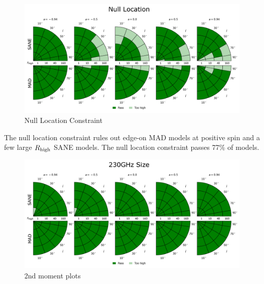 
\begin{figure}
  \centering
  \includegraphics[width=\columnwidth]{./figures/Null_loc_Constraints.png}
  \caption{Null Location Constraint}
  \label{fig:cmp_ozel}
\end{figure}

The null location constraint rules out edge-on MAD models at positive spin and a few large $R_\mathrm{high}$ SANE models.  The null location constraint passes 77\% of models.


\begin{figure}
  \centering
  \includegraphics[width=\columnwidth]{./figures/230GHz_size_Constraints.png}
  \caption{2nd moment plots}
  \label{fig:cmp_2nd_moment}
\end{figure}

